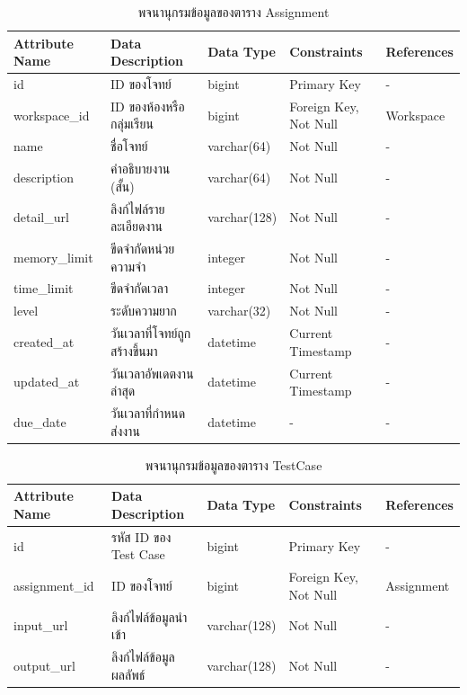 \documentclass[12pt,one side,openright,a4paper]{cpe-thesis-th}
\begin{document}
\begin{table}[H]
  \centering
  \caption{พจนานุกรมข้อมูลของตาราง Assignment}\label{tbl:data-dict-assignment}
  \begin{tabular}{p{2cm}|p{4cm}p{2cm}p{3cm}p{2cm}} \hline\hline
    Attribute Name & Data Description      & Data Type    & Constraints           & References \\ \hline\hline
    id             & ID ของโจทย์            & bigint       & Primary Key           & -          \\
    workspace\_id  & ID ของห้องหรือกลุ่มเรียน   & bigint       & Foreign Key, Not Null & Workspace  \\
    name           & ชื่อโจทย์                & varchar(64)  & Not Null              & -          \\
    description    & คำอธิบายงาน (สั้น)        & varchar(64)  & Not Null              & -          \\
    detail\_url    & ลิงก์ไฟล์รายละเอียดงาน    & varchar(128) & Not Null              & -          \\
    memory\_limit  & ขีดจำกัดหน่วยความจำ        & integer      & Not Null              & -          \\
    time\_limit    & ขีดจำกัดเวลา             & integer      & Not Null              & -          \\
    level          & ระดับความยาก           & varchar(32)  & Not Null              & -          \\
    created\_at    & วันเวลาที่โจทย์ถูกสร้างขึ้นมา & datetime     & Current Timestamp     & -          \\
    updated\_at    & วันเวลาอัพเดตงานล่าสุด    & datetime     & Current Timestamp     & -          \\
    due\_date      & วันเวลาที่กำหนดส่งงาน      & datetime     & -                     & -          \\ \hline\hline
  \end{tabular}
\end{table}
\begin{table}[H]
  \centering
  \caption{พจนานุกรมข้อมูลของตาราง TestCase}\label{tbl:data-dict-testcase}
  \begin{tabular}{p{2cm}|p{4cm}p{2cm}p{3cm}p{2cm}} \hline\hline
    Attribute Name & Data Description     & Data Type    & Constraints           & References \\ \hline\hline
    id             & รหัส ID ของ Test Case & bigint       & Primary Key           & -          \\
    assignment\_id & ID ของโจทย์           & bigint       & Foreign Key, Not Null & Assignment \\
    input\_url     & ลิงก์ไฟล์ข้อมูลนำเข้า       & varchar(128) & Not Null              & -          \\
    output\_url    & ลิงก์ไฟล์ข้อมูลผลลัพธ์      & varchar(128) & Not Null              & -          \\ \hline\hline
  \end{tabular}
\end{table}
\end{document}
